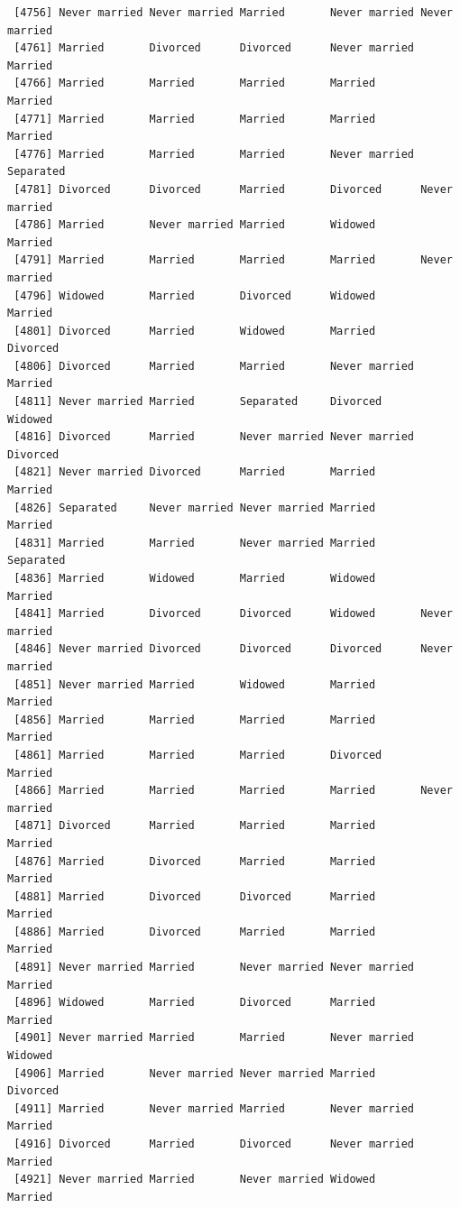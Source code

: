 \documentclass[
  letterpaper,
  DIV=11,
  numbers=noendperiod,
  oneside]{scrartcl}
\begin{document}
\begin{verbatim}
 [4756] Never married Never married Married       Never married Never married
 [4761] Married       Divorced      Divorced      Never married Married      
 [4766] Married       Married       Married       Married       Married      
 [4771] Married       Married       Married       Married       Married      
 [4776] Married       Married       Married       Never married Separated    
 [4781] Divorced      Divorced      Married       Divorced      Never married
 [4786] Married       Never married Married       Widowed       Married      
 [4791] Married       Married       Married       Married       Never married
 [4796] Widowed       Married       Divorced      Widowed       Married      
 [4801] Divorced      Married       Widowed       Married       Divorced     
 [4806] Divorced      Married       Married       Never married Married      
 [4811] Never married Married       Separated     Divorced      Widowed      
 [4816] Divorced      Married       Never married Never married Divorced     
 [4821] Never married Divorced      Married       Married       Married      
 [4826] Separated     Never married Never married Married       Married      
 [4831] Married       Married       Never married Married       Separated    
 [4836] Married       Widowed       Married       Widowed       Married      
 [4841] Married       Divorced      Divorced      Widowed       Never married
 [4846] Never married Divorced      Divorced      Divorced      Never married
 [4851] Never married Married       Widowed       Married       Married      
 [4856] Married       Married       Married       Married       Married      
 [4861] Married       Married       Married       Divorced      Married      
 [4866] Married       Married       Married       Married       Never married
 [4871] Divorced      Married       Married       Married       Married      
 [4876] Married       Divorced      Married       Married       Married      
 [4881] Married       Divorced      Divorced      Married       Married      
 [4886] Married       Divorced      Married       Married       Married      
 [4891] Never married Married       Never married Never married Married      
 [4896] Widowed       Married       Divorced      Married       Married      
 [4901] Never married Married       Married       Never married Widowed      
 [4906] Married       Never married Never married Married       Divorced     
 [4911] Married       Never married Married       Never married Married      
 [4916] Divorced      Married       Divorced      Never married Married      
 [4921] Never married Married       Never married Widowed       Married      

\end{verbatim}
\end{document}
